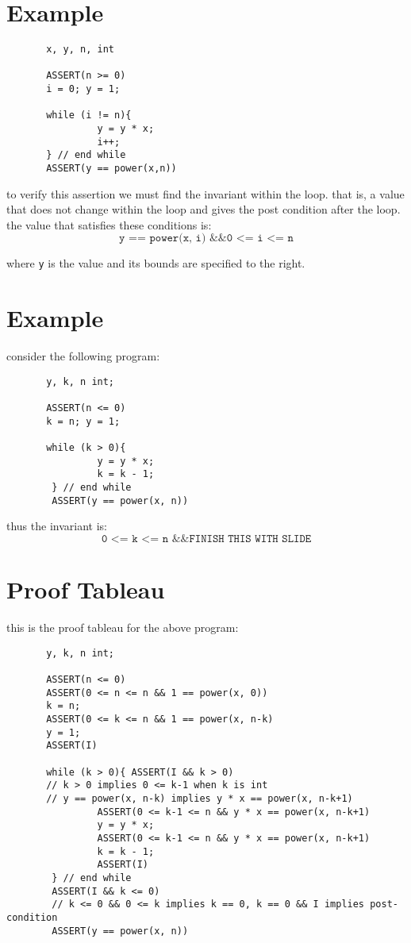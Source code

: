 \documentclass[12pt]{book}
\title{\coursetitle\linebreak\lecturename}
\author{\\Cain Susko\\ 
           \\ \\ \\
      Queen's University 
    \\School of Computing\\}
\begin{document}
\begin{titlepage}
        \maketitle
\end{titlepage}


\section*{Example}
\begin{verbatim}
       x, y, n, int

       ASSERT(n >= 0)
       i = 0; y = 1;

       while (i != n){
                y = y * x;
                i++;
       } // end while
       ASSERT(y == power(x,n))
\end{verbatim}

to verify this assertion we must find the invariant within the loop. that is, a value that does not change within the loop
and gives the post condition after the loop. the value that satisfies these conditions is:
\[\texttt{y == power(x, i) \&\& 0 <= i <= n}\]

where \texttt{y} is the value and its bounds are specified to the right.

\section*{Example}
consider the following program:
\begin{verbatim}
       y, k, n int;

       ASSERT(n <= 0)
       k = n; y = 1;

       while (k > 0){
                y = y * x;
                k = k - 1;
        } // end while
        ASSERT(y == power(x, n))
\end{verbatim}

thus the invariant is:
\[\texttt{0 <= k <= n \&\& FINISH THIS WITH SLIDE}\]

\section*{Proof Tableau}
this is the proof tableau for the above program:
\begin{verbatim}
       y, k, n int;

       ASSERT(n <= 0)
       ASSERT(0 <= n <= n && 1 == power(x, 0))
       k = n; 
       ASSERT(0 <= k <= n && 1 == power(x, n-k)
       y = 1;
       ASSERT(I)

       while (k > 0){ ASSERT(I && k > 0)
       // k > 0 implies 0 <= k-1 when k is int
       // y == power(x, n-k) implies y * x == power(x, n-k+1)
                ASSERT(0 <= k-1 <= n && y * x == power(x, n-k+1)
                y = y * x;
                ASSERT(0 <= k-1 <= n && y * x == power(x, n-k+1)
                k = k - 1;
                ASSERT(I)
        } // end while
        ASSERT(I && k <= 0)
        // k <= 0 && 0 <= k implies k == 0, k == 0 && I implies post-condition 
        ASSERT(y == power(x, n))
\end{verbatim}
\end{document}
